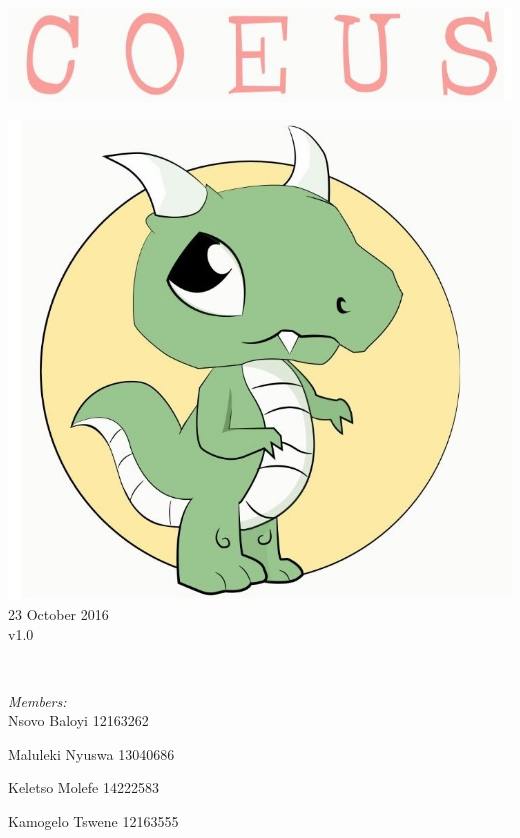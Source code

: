 \documentclass[a4paper,12pt]{article}
\begin{document}
\begin{titlepage}
	\includegraphics[width=\textwidth]{../name} \\[1cm]
	\begin{minipage}{0.4\textwidth}
	\begin{flushleft} \large
	\includegraphics[width=\textwidth]{../logo} \\[0.5cm]
	{\large 23 October 2016}\\
	{\large v1.0}
	\end{flushleft}
	\end{minipage}
	~
	\begin{minipage}{0.5\textwidth}
	\begin{flushright} \large
	\emph{Members:}\\%
	Nsovo Baloyi 12163262

	Maluleki Nyuswa 13040686
	
	Keletso Molefe 14222583
	
	Kamogelo Tswene 12163555

	\end{flushright}
	\end{minipage}\\[4cm]
\end{titlepage}
\end{document}
